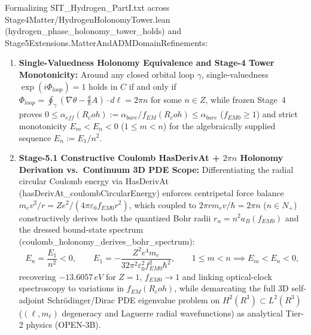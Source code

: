 \documentclass[american,11pt,letterpaper]{article}
\newcommand{\Rcoh}{R_{\mathrm{coh}}}
\def\mathbb#1{#1}%
\def\mathbf#1{#1}%
\def\mathrm#1{#1}%
\def\texttt#1{#1}%
\def\Rcoh{R_coh}%
\begin{document}
Formalizing \texttt{SIT\_\allowbreak{}Hydrogen\_\allowbreak{}Part\allowbreak{}I.\allowbreak{}txt} across \texttt{Stage4\allowbreak{}Matter/Hydrogen\allowbreak{}Holonomy\allowbreak{}Tower.\allowbreak{}lean} (\texttt{hydrogen\_\allowbreak{}phase\_\allowbreak{}holonomy\_\allowbreak{}tower\_\allowbreak{}holds}) and \texttt{Stage5\allowbreak{}Extensions.\allowbreak{}Matter\allowbreak{}And\allowbreak{}ADMDomain\allowbreak{}Refinements}:
\begin{enumerate}[leftmargin=2em]
  \item \textbf{Single-Valuedness Holonomy Equivalence and Stage-4 Tower Monotonicity:} Around any closed orbital loop $\gamma$, single-valuedness $\exp(i\Phi_{\mathrm{loop}}) = 1$ holds in $\mathbb{C}$ if and only if $\Phi_{\mathrm{loop}} = \oint_\gamma(\nabla\theta - \frac{q}{\hbar}\mathbf{A})\cdot d\boldsymbol{\ell} = 2\pi n$ for some $n \in \mathbb{Z}$, while frozen Stage~4 proves $0 \le \alpha_{\mathrm{eff}}(\Rcoh) := \alpha_{\mathrm{bare}}/f_{\mathrm{EM}}(\Rcoh) \le \alpha_{\mathrm{bare}}$ ($f_{\mathrm{EM}0} \ge 1$) and strict monotonicity $E_m < E_n < 0$ ($1 \le m < n$) for the algebraically supplied sequence $E_n := E_1/n^2$.
  \item \textbf{Stage-5.1 Constructive Coulomb \texttt{HasDerivAt} + $2\pi n$ Holonomy Derivation vs.\ Continuum 3D PDE Scope:} Differentiating the radial circular Coulomb energy via \texttt{HasDerivAt} (\texttt{has\allowbreak{}Deriv\allowbreak{}At\_\allowbreak{}coulomb\allowbreak{}Circular\allowbreak{}Energy}) enforces centripetal force balance $m_e v^2/r = Z e^2/(4\pi\varepsilon_0 f_{\mathrm{EM}0} r^2)$, which coupled to $2\pi r m_e v/\hbar = 2\pi n$ ($n \in \mathbb{N}_+$) constructively derives both the quantized Bohr radii $r_n = n^2 a_B(f_{\mathrm{EM}0})$ and the dressed bound-state spectrum (\texttt{coulomb\_\allowbreak{}holonomy\_\allowbreak{}derives\_\allowbreak{}bohr\_\allowbreak{}spectrum}):
  \begin{equation}
  E_n = \frac{E_1}{n^2} < 0,
  \qquad
  E_1 = -\frac{Z^2 e^4 m_e}{32\pi^2\varepsilon_0^2 f_{\mathrm{EM}0}^2 \hbar^2},
  \qquad
  1 \le m < n \implies E_m < E_n < 0,
  \label{eq:hydrogen_bohr_tower}
  \end{equation}
  recovering $-13.6057\,\mathrm{eV}$ for $Z=1$, $f_{\mathrm{EM}0} \to 1$ and linking optical-clock spectroscopy to variations in $f_{\mathrm{EM}}(\Rcoh)$, while demarcating the full 3D self-adjoint Schr\"odinger/Dirac PDE eigenvalue problem on $H^2(\mathbb{R}^3) \subset L^2(\mathbb{R}^3)$ ($(\ell,m_\ell)$ degeneracy and Laguerre radial wavefunctions) as analytical Tier-2 physics (\texttt{OPEN-3B}).
\end{enumerate}
\end{document}
